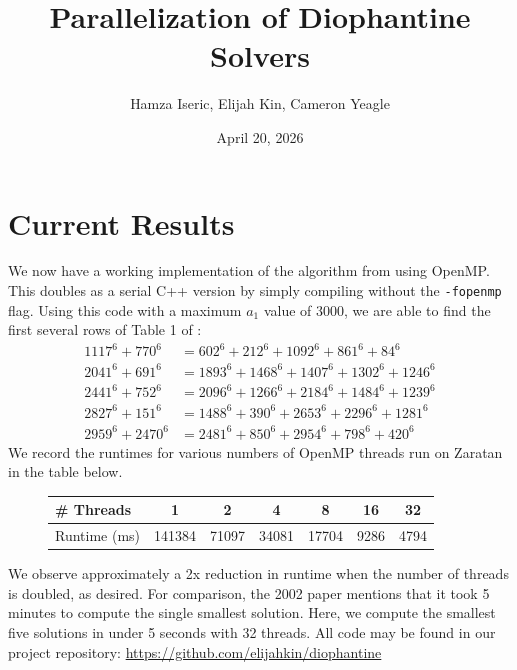 \documentclass[11pt, letterpaper]{article}
\title{Parallelization of Diophantine Solvers}
\author{Hamza Iseric, Elijah Kin, Cameron Yeagle}
\date{April 20, 2026}
\begin{document}
\maketitle

\section*{Current Results}
We now have a working implementation of the algorithm from \cite{RM03} using OpenMP. This doubles as a serial C++ version by simply compiling without the \texttt{-fopenmp} flag. Using this code with a maximum $a_1$ value of $3000$, we are able to find the first several rows of Table 1 of \cite{RM03}:
\begin{align*}
  1117^6 + 770^6 &= 602^6 + 212^6 + 1092^6 + 861^6 + 84^6 \\
  2041^6 + 691^6 &= 1893^6 + 1468^6 + 1407^6 + 1302^6 + 1246^6 \\
  2441^6 + 752^6 &= 2096^6 + 1266^6 + 2184^6 + 1484^6 + 1239^6 \\
  2827^6 + 151^6 &= 1488^6 + 390^6 + 2653^6 + 2296^6 + 1281^6 \\
  2959^6 + 2470^6 &= 2481^6 + 850^6 + 2954^6 + 798^6 + 420^6
\end{align*}
We record the runtimes for various numbers of OpenMP threads run on Zaratan in the table below.
\begin{figure}
  \centering
  \begin{tabular}{|l|c|c|c|c|c|c|}
    \hline
    \# Threads & 1 & 2 & 4 & 8 & 16 & 32 \\
    \hline
    Runtime (ms) & 141384 & 71097 & 34081 & 17704 & 9286 & 4794 \\
    \hline
  \end{tabular}
\end{figure}
We observe approximately a 2x reduction in runtime when the number of threads is doubled, as desired. For comparison, the 2002 paper mentions that it took 5 minutes to compute the single smallest solution. Here, we compute the smallest five solutions in under 5 seconds with 32 threads. All code may be found in our project repository: \url{https://github.com/elijahkin/diophantine}
\end{document}

